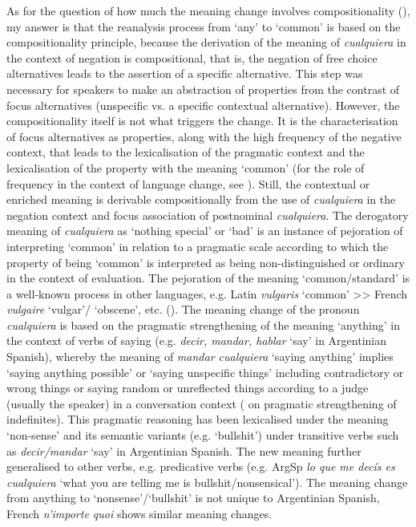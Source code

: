 As for the question of how much the meaning change involves compositionality (\cite{Frege1997, Eckardt2006, Aloni2021, Bar-asher-siegal2020, Condoravdi2015}), my answer is that the reanalysis process from ‘any’ to ‘common’ is based on the compositionality principle, because the derivation of the meaning of \textit{cualquiera} in the context of negation is compositional, that is, the negation of free choice alternatives leads to the assertion of a specific alternative. This step was necessary for speakers to make an abstraction of properties from the contrast of focus alternatives (unspecific vs. a specific contextual alternative). However, the compositionality itself is not what triggers the change. It is the characterisation of focus alternatives as properties, along with the high frequency of the negative context, that leads to the lexicalisation of the pragmatic context and the lexicalisation of the property with the meaning ‘common’ (for the role of frequency in the context of language change, see \cite{Pagel2007, Bybee2006}). 
Still, the contextual or enriched meaning is derivable compositionally from the use of \textit{cualquiera} in the negation context and focus association of postnominal \textit{cualquiera}. The derogatory meaning of \textit{cualquiera} as ‘nothing special’ or ‘bad’ is an instance of pejoration of interpreting ‘common’ in relation to a pragmatic scale according to which the property of being ‘common’ is interpreted as being non-distinguished or ordinary in the context of evaluation. The pejoration of the meaning ‘common/standard’ is a well-known process in other languages, e.g. Latin \textit{vulgaris} ‘common’ >{}> French \textit{vulgaire} ‘vulgar’/ ‘obscene’, etc. (\cite {Borkowska2007}).
The meaning change of the pronoun \textit{cualquiera} is based on the pragmatic strengthening of the meaning ‘anything’ in the context of verbs of saying (e.g. \textit{decir, mandar, hablar} ‘say’ in Argentinian Spanish), whereby the meaning of \textit{mandar cualquiera} ‘saying anything’ implies ‘saying anything possible’ or ‘saying unspecific things’ including contradictory or wrong things or saying random or unreflected things according to a judge (usually the speaker) in a conversation context (\cite {Grice1975, Chierchia2013} on pragmatic strengthening of indefinites). This pragmatic reasoning has been lexicalised under the meaning ‘non-sense’ and its semantic variants (e.g. ‘bullshit’) under transitive verbs such as \textit{decir/mandar} ‘say’ in Argentinian Spanish. The new meaning further generalised to other verbs, e.g. predicative verbs (e.g. ArgSp \textit{lo que me decís es cualquiera} ‘what you are telling me is bullshit/nonsensical’). The meaning change from anything to ‘nonsense’/‘bullshit’ is not unique to Argentinian Spanish, French \textit{n’importe quoi} shows similar meaning changes.


